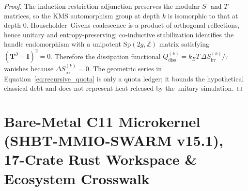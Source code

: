 \documentclass[11pt,onecolumn]{article}
\begin{document}
\begin{proof}
The induction-restriction adjunction preserves the modular $S$- and $T$-matrices, so the KMS automorphism group at depth $k$ is isomorphic to that at depth $0$. Householder--Givens coalescence is a product of orthogonal reflections, hence unitary and entropy-preserving; co-inductive stabilization identifies the handle endomorphism with a unipotent $\mathrm{Sp}(2g,\mathbb Z)$ matrix satisfying $(\mathbf T^\partial-\mathbf I)^2=0$. Therefore the dissipation functional $Q_{\text{diss}}^{(k)}=k_B T\,\Delta S_{\text{irr}}^{(k)}/\tau$ vanishes because $\Delta S_{\text{irr}}^{(k)}=0$. The geometric series in Equation~\eqref{eq:recursive_quota} is only a quota ledger; it bounds the hypothetical classical debt and does not represent heat released by the unitary simulation.
\end{proof}

\section{Bare-Metal C11 Microkernel (SHBT-MMIO-SWARM v15.1), 17-Crate Rust Workspace \& Ecosystem Crosswalk}
\label{sec:c11_microkernel_v11}
\end{document}
